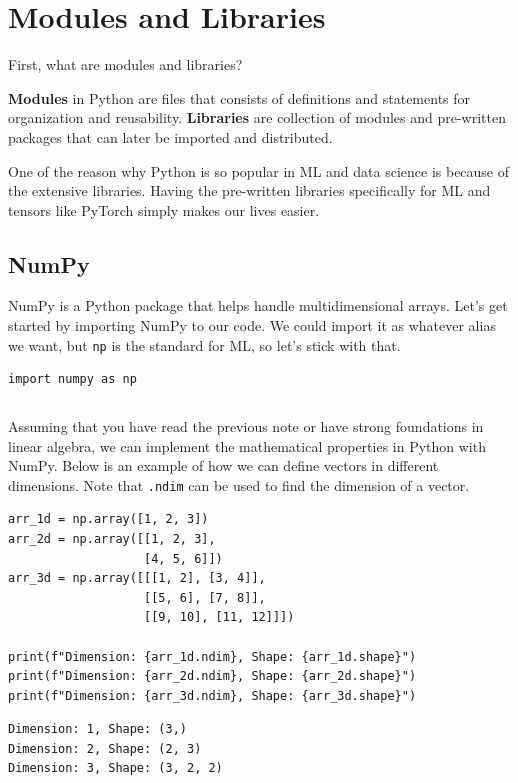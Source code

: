 \documentclass[../../../main.tex]{subfiles}
\begin{document}
\section{Modules and Libraries}

First, what are modules and libraries?

\begin{definition}{}{}
\textbf{Modules} in Python are files that consists of definitions
and statements for organization and reusability. \textbf{Libraries}
are collection of modules and pre-written packages that can later
be imported and distributed.
\end{definition}

One of the reason why Python is so popular in ML and data science
is because of the extensive libraries. Having the pre-written
libraries specifically for ML and tensors like PyTorch simply
makes our lives easier.

\subsection{NumPy}

NumPy is a Python package that helps handle multidimensional arrays.
Let's get started by importing NumPy to our code. We could import
it as whatever alias we want, but \verb|np| is the standard for ML,
so let's stick with that.

\begin{jupyter}
\begin{lstlisting}[style=jin]
import numpy as np
\end{lstlisting}
\begin{lstlisting}[style=jout]
\end{lstlisting}
\end{jupyter}

Assuming that you have read the previous note or have strong
foundations in linear algebra, we can implement the mathematical
properties in Python with NumPy. Below is an example of how we can
define vectors in different dimensions. Note that \verb|.ndim| can
be used to find the dimension of a vector.

\begin{jupyter}
\begin{lstlisting}[style=jin]
arr_1d = np.array([1, 2, 3])
arr_2d = np.array([[1, 2, 3],
                   [4, 5, 6]])
arr_3d = np.array([[[1, 2], [3, 4]],
                   [[5, 6], [7, 8]],
                   [[9, 10], [11, 12]]])

print(f"Dimension: {arr_1d.ndim}, Shape: {arr_1d.shape}")
print(f"Dimension: {arr_2d.ndim}, Shape: {arr_2d.shape}")
print(f"Dimension: {arr_3d.ndim}, Shape: {arr_3d.shape}")
\end{lstlisting}

\begin{lstlisting}[style=jout]
Dimension: 1, Shape: (3,)
Dimension: 2, Shape: (2, 3)
Dimension: 3, Shape: (3, 2, 2)
\end{lstlisting}
\end{jupyter}
\end{document}
